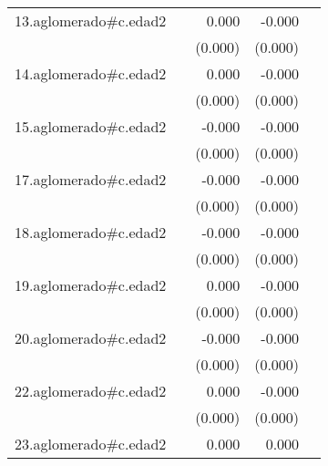 {\begin{longtable}{l*{4}{D{.}{.}{-1}}}
\addlinespace
13.aglomerado#c.edad2&                     &       0.000\sym{**} &      -0.000         &                     \\
            &                     &     (0.000)         &     (0.000)         &                     \\
\addlinespace
14.aglomerado#c.edad2&                     &       0.000         &      -0.000         &                     \\
            &                     &     (0.000)         &     (0.000)         &                     \\
\addlinespace
15.aglomerado#c.edad2&                     &      -0.000         &      -0.000         &                     \\
            &                     &     (0.000)         &     (0.000)         &                     \\
\addlinespace
17.aglomerado#c.edad2&                     &      -0.000         &      -0.000\sym{*}  &                     \\
            &                     &     (0.000)         &     (0.000)         &                     \\
\addlinespace
18.aglomerado#c.edad2&                     &      -0.000         &      -0.000\sym{***}&                     \\
            &                     &     (0.000)         &     (0.000)         &                     \\
\addlinespace
19.aglomerado#c.edad2&                     &       0.000         &      -0.000         &                     \\
            &                     &     (0.000)         &     (0.000)         &                     \\
\addlinespace
20.aglomerado#c.edad2&                     &      -0.000         &      -0.000\sym{*}  &                     \\
            &                     &     (0.000)         &     (0.000)         &                     \\
\addlinespace
22.aglomerado#c.edad2&                     &       0.000         &      -0.000         &                     \\
            &                     &     (0.000)         &     (0.000)         &                     \\
\addlinespace
23.aglomerado#c.edad2&                     &       0.000\sym{**} &       0.000\sym{*}  &                     \\

\end{longtable}}
